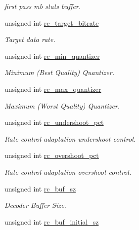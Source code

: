 \begin{DoxyCompactItemize}
\begin{DoxyCompactList}\small\item\em first pass mb stats buffer. \end{DoxyCompactList}\item 
unsigned int \hyperlink{structaom__codec__enc__cfg_ab21539da477dba7506d90353c27d218b}{rc\+\_\+target\+\_\+bitrate}
\begin{DoxyCompactList}\small\item\em Target data rate. \end{DoxyCompactList}\item 
unsigned int \hyperlink{structaom__codec__enc__cfg_aa5c6cede8c820ef29fc3c106aa1227eb}{rc\+\_\+min\+\_\+quantizer}
\begin{DoxyCompactList}\small\item\em Minimum (Best Quality) Quantizer. \end{DoxyCompactList}\item 
unsigned int \hyperlink{structaom__codec__enc__cfg_a8f8851455e06db026022d4b01671b122}{rc\+\_\+max\+\_\+quantizer}
\begin{DoxyCompactList}\small\item\em Maximum (Worst Quality) Quantizer. \end{DoxyCompactList}\item 
unsigned int \hyperlink{structaom__codec__enc__cfg_a8695946812f24f3719aed80cff00aa29}{rc\+\_\+undershoot\+\_\+pct}
\begin{DoxyCompactList}\small\item\em Rate control adaptation undershoot control. \end{DoxyCompactList}\item 
unsigned int \hyperlink{structaom__codec__enc__cfg_ad57c8287bcacf2ca7230a3e11906b65c}{rc\+\_\+overshoot\+\_\+pct}
\begin{DoxyCompactList}\small\item\em Rate control adaptation overshoot control. \end{DoxyCompactList}\item 
unsigned int \hyperlink{structaom__codec__enc__cfg_a2eb74c50bbc22536248925cd92b746c2}{rc\+\_\+buf\+\_\+sz}
\begin{DoxyCompactList}\small\item\em Decoder Buffer Size. \end{DoxyCompactList}\item 
unsigned int \hyperlink{structaom__codec__enc__cfg_a6c25595e7dfcdf3229c3f66c91224fcc}{rc\+\_\+buf\+\_\+initial\+\_\+sz}

\end{DoxyCompactItemize}
